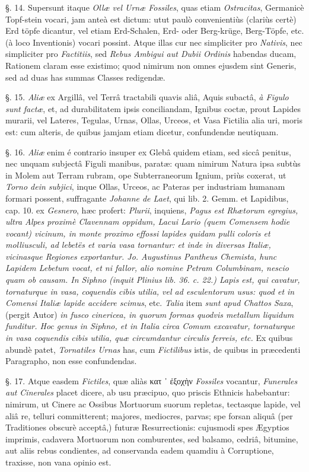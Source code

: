 \documentclass[a4paper, 11pt, oneside, polutonikogreek, german]{article}
\begin{document}
§. 14. Supersunt itaque \emph{Ollæ vel Urnæ Fossiles}, quas etiam \emph{Ostracitas}, Germanicè Topf-stein vocari, jam anteà est dictum: utut paulò convenientiùs (clariùs certè) Erd töpfe dicantur, vel etiam Erd-Schalen, Erd- oder Berg-krüge, Berg-Töpfe, etc. (à loco Inventionis) vocari possint. Atque illas cur nec simpliciter pro \emph{Nativis}, nec simpliciter pro \emph{Factitiis}, sed \emph{Rebus Ambigui aut Dubii Ordinis} habendas ducam, Rationem claram esse existimo; quod nimirum non omnes ejusdem sint Generis, sed ad duas has summas Classes redigendæ.

§. 15. \emph{Aliæ} ex Argillâ, vel Terrâ tractabili quavis aliâ, Aquis subactâ, \emph{à Figulo sunt factæ}, et, ad durabilitatem ipsis conciliandam, Ignibus coctæ, prout Lapides murarii, vel Lateres, Tegulas, Urnas, Ollas, Urceos, et Vasa Fictilia alia uri, moris est: cum alteris, de quibus jamjam etiam dicetur, confundendæ neutiquam.

§. 16. \emph{Aliæ} enim é contrario insuper ex Glebâ quidem etiam, sed siccâ penitus, nec unquam subjectâ Figuli manibus, paratæ: quam nimirum Natura ipsa subtùs in Molem aut Terram rubram, ope Subterraneorum Ignium, priùs coxerat, ut \emph{Torno dein subjici}, inque Ollas, Urceos, ac Pateras per industriam humanam formari possent, suffragante \emph{Johanne de Laet}, qui lib. 2. Gemm. et Lapidibus, cap. 10. ex \emph{Gesnero}, hæc profert: \emph{Plurii}, inquiens, \emph{Pagus est Rhætorum egregius, ultra Alpes proximè Clavennam oppidum, Lacui Lario (quem Comensem hodie vocant) vicinum, in monte proximo effossi lapides quidam pulli coloris et molliusculi, ad lebetës et varia vasa tornantur: et inde in diversas Italiæ, vicinasque Regiones exportantur. Jo. Augustinus Pantheus Chemista, hunc Lapidem Lebetum vocat, et ni fallor, alio nomine Petram Columbinam, nescio quam ob causam. In Siphno (inquit Plinius lib. 36. c. 22.) Lapis est, qui cavatur, tornaturque in vasa, coquendis cibis utilia, vel ad esculentorum usus: quod et in Comensi Italiæ lapide accidere scimus}, etc. \emph{Talia} item \emph{sunt apud Chattos Saxa}, (pergit Autor) \emph{in fusco cinericea, in quorum formas quodvis metallum liquidum funditur. Hoc genus in Siphno, et in Italia circa Comum excavatur, tornaturque in vasa coquendis cibis utilia, quæ circumdantur circulis ferreis, etc.} Ex quibus abundè patet, \emph{Tornatiles Urnas} has, cum \emph{Fictilibus} istis, de quibus in præcedenti Paragrapho, non esse confundendas.

§. 17. Atque easdem \emph{Fictiles}, quæ aliàs κατ ᾽ ἐξοχὴν \emph{Fossiles} vocantur, \emph{Funerales aut Cinerales} placet dicere, ab usu præcipuo, quo priscis Ethnicis habebantur: nimirum, ut Cinere ac Ossibus Mortuorum suorum repletas, tectasque lapide, vel aliâ re, telluri committerent; majores, mediocres, parvas; spe forsan aliquâ (per Traditiones obscurè acceptâ,) futuræ Resurrectionis: cujusmodi spes Ægyptios imprimis, cadavera Mortuorum non comburentes, sed balsamo, cedriâ, bitumine, aut aliis rebus condientes, ad conservanda eadem quamdiu à Corruptione, traxisse, non vana opinio est.
\end{document}
